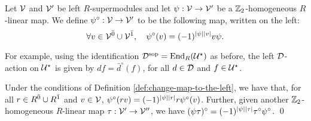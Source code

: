 
\begin{defi}\label{def:change-map-to-the-left}
	Let $\mathcal V$ and $\mathcal V'$ be left $R$-supermodules and let $\psi: \mathcal V \to \mathcal V'$ be a $\mathbb{Z}_2$-homogeneous $R$-linear map. 
	We define $\psi^\circ: \mathcal V \to  \mathcal V'$ to be the following map, written on the left:
	\[
		\forall v\in \mathcal V^{\bar0} \cup \mathcal V^{\bar1}, \quad \psi^\circ(v) = (-1)^{|\psi||v|} v\psi.
	\]
\end{defi}

For example, using the identification $\mathcal{D}^{\mathrm{sop}} = \operatorname{End}_R (\mathcal U^\star)$ as before, the left $\mathcal{D}$-action on $\mathcal U^\star$ is given by $df = \bar d^\circ (f)$, for all $d\in \mathcal{D}$ and $f\in \mathcal U^\star$.

\begin{lemma}\label{lemma:change-of-side-properties}
	Under the conditions of Definition \ref{def:change-map-to-the-left}, we have that, for all $r\in R^{\bar0} \cup R^{\bar1}$ and $v\in \mathcal V$,  $\psi^\circ (rv) = (-1)^{|\psi||r|} r \psi^\circ (v)$.
	Further, given another $\mathbb{Z}_2$-homogeneous $R$-linear map $\tau: \mathcal V' \to \mathcal V''$, we have $(\psi\tau)^\circ = (-1)^{|\psi||\tau|} \tau^\circ\psi^\circ$. \qed
\end{lemma}



